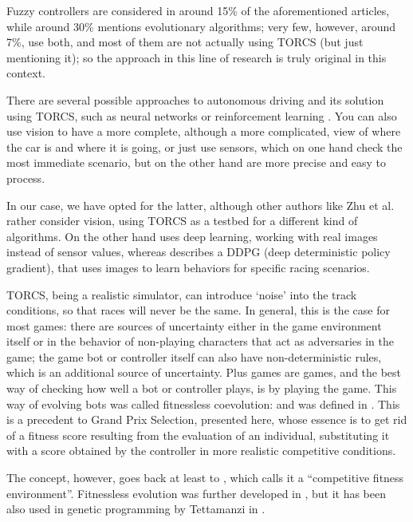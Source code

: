 \documentclass[10pt,journal,compsoc]{IEEEtran}
\begin{document}
Fuzzy controllers are considered in around 15\% of the aforementioned articles, while around 30\% mentions evolutionary algorithms; very few, however, around 7\%, use both, and most of them are not actually using TORCS (but just mentioning it); so the approach in this line of research is truly original in this context.

There are several possible approaches to autonomous driving and its
solution using TORCS, such as neural networks or reinforcement learning \cite{abuzekry2comparative}. 
You can also use vision to have a more complete, although a more complicated, view of where the car is and where it is going, or just use sensors, which on one hand check the most immediate scenario, but on the other hand are more precise and easy to process.

In our case, we have opted for the latter, although other authors like Zhu et al. \cite{zhu2019vision} rather
consider vision, using TORCS as a testbed for a different kind of
algorithms. On the other hand \cite{8833873} uses deep learning, working with real images instead of sensor values, whereas \cite{Kaushik_2018_ECCV_Workshops} describes a DDPG (deep deterministic policy gradient), that uses images to learn behaviors for specific racing scenarios.

TORCS, being a realistic simulator, can introduce `noise' into
the track conditions, so that races will never be the same. In
general, this is the case for most games: there are sources of
uncertainty either in the game environment itself or in the behavior
of non-playing characters that act as adversaries in the game; the
game bot or controller itself can also have non-deterministic rules,
which is an additional source of uncertainty. Plus games are games,
and the best way of checking how well a bot or controller plays, is by
playing the game. This way of evolving bots was called fitnessless
coevolution: and was defined in
\cite{Jaskowski:2008:FC:1389095.1389161}. This is a precedent to
Grand Prix Selection, presented here, whose essence is
to get rid of a fitness score resulting from the evaluation of an individual, substituting it with a score obtained by the controller in
more realistic competitive conditions.

The concept, however, goes back at least to
\cite{Angeline:1993:CEE:645513.657590}, which calls it a ``competitive
fitness environment''. Fitnessless evolution was further developed in
\cite{rosin1995methods}, but it has been also used in genetic
programming by Tettamanzi in \cite{tettamanzi1996genetic}.
\end{document}
